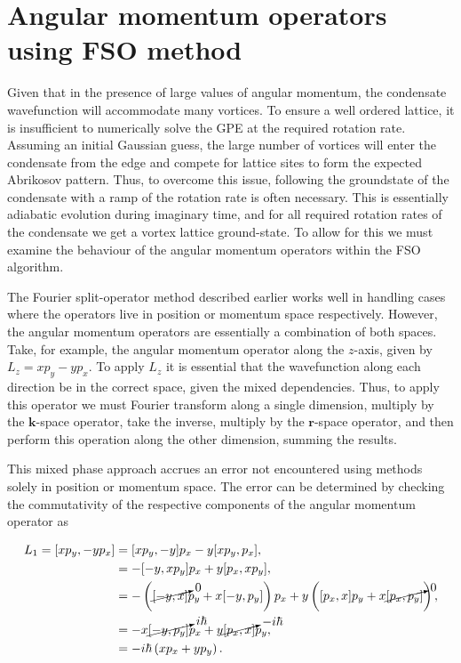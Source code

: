 \section{Angular momentum operators using FSO method}

Given that in the presence of large values of angular momentum, the condensate wavefunction will accommodate many vortices. To ensure a well ordered lattice, it is insufficient to numerically solve the GPE at the required rotation rate. Assuming an initial Gaussian guess, the large number of vortices will enter the condensate from the edge and compete for lattice sites to form the expected Abrikosov pattern. Thus, to overcome this issue, following the groundstate of the condensate with a ramp of the rotation rate is often necessary. This is essentially adiabatic evolution during imaginary time, and for all required rotation rates of the condensate we get a vortex lattice ground-state. To allow for this we must examine the behaviour of the angular momentum operators within the FSO algorithm.

The Fourier split-operator method described earlier works well in handling cases where the operators live in position or momentum space respectively. However, the angular momentum operators are essentially a combination of both spaces. Take, for example, the angular momentum operator along the $z$-axis, given by $L_z = xp_y - yp_x$. To apply $L_z$ it is essential that the wavefunction along each direction be in the correct space, given the mixed dependencies. Thus, to apply this operator we must Fourier transform along a single dimension, multiply by the $\mathbf{k}$-space operator, take the inverse, multiply by the $\mathbf{r}$-space operator, and then perform this operation along the other dimension, summing the results.

 This mixed phase approach accrues an error not encountered using methods solely in position or momentum space. The error can be determined by checking the commutativity of the respective components of the angular momentum operator as

 \begin{subequations}
 \begin{align}
 	L_1 = [x p_y,-y p_x] &= [x p_y,-y] p_x  -  y[x p_y,p_x], \\
 				   &= -[-y,x p_y] p_x + y [p_x, x p_y], \\
 				   &= -\left( {\cancelto{0}{[-y,x]}} p_y + x [-y,p_y] \right) p_x + y \left( [p_x,x] p_y + x {\cancelto{0}{[p_x,p_y]}} \right), \\
 				   &= -x {\cancelto{i\hbar}{[-y, p_y]}} p_x + y {\cancelto{-i\hbar}{[p_x,x]}} p_y, \\
 				   &= -i\hbar \left(x p_x + y p_y \right).
 \end{align}
\end{subequations}

